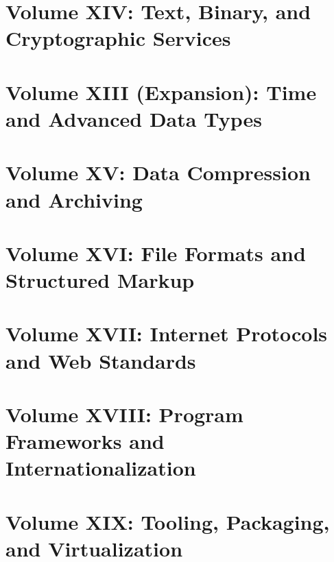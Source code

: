 \documentclass[11pt, a4paper, openany]{book}
\begin{document}
\part{Volume XIV: Text, Binary, and Cryptographic Services}




\part{Volume XIII (Expansion): Time and Advanced Data Types}


\part{Volume XV: Data Compression and Archiving}



\part{Volume XVI: File Formats and Structured Markup}



\part{Volume XVII: Internet Protocols and Web Standards}



\part{Volume XVIII: Program Frameworks and Internationalization}


\backmatter



\part{Volume XIX: Tooling, Packaging, and Virtualization}




\end{document}
